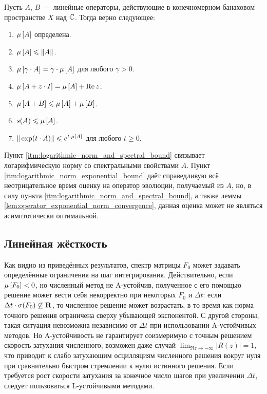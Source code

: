 \begin{statement}
    \label{stat:logarithmic_norm_properties}
    Пусть $ A $, $ B $~--- линейные операторы, действующие в конечномерном банаховом пространстве $ X $ над $ \mathbb{C} $.
    Тогда верно следующее:
    \begin{enumerate}[itemsep=0em]
        \item $ \mu \left[ A \right] $ определена.
        \item $ \mu \left[ A \right] \leqslant \| A \| $.
        \item $ \mu \left[ \gamma \cdot A \right] = \gamma \cdot \mu \left[ A \right] $ для любого $ \gamma > 0 $.
        \item $ \mu \left[ A + z \cdot I \right] = \mu \left[ A \right] + \operatorname{Re} z $.
        \item $ \mu \left[ A + B \right] \leqslant \mu \left[ A \right] + \mu \left[ B \right] $.
        \item $ s(A) \leqslant \mu \left[ A \right] $. \label{itm:logarithmic_norm_and_spectral_bound}
        \item $ \| \exp(t \cdot A) \| \leqslant e^{t \cdot \mu \left[ A \right]} $ для любого $ t \geqslant 0 $. \label{itm:logarithmic_norm_exponential_bound}
    \end{enumerate}
\end{statement}

Пункт \ref{itm:logarithmic_norm_and_spectral_bound} связывает логарифмическую норму со спектральными свойствами $ A $.
Пункт \ref{itm:logarithmic_norm_exponential_bound} даёт справедливую всё неотрицательное время оценку на оператор эволюции,
получаемый из $ A $, но, в силу пункта \ref{itm:logarithmic_norm_and_spectral_bound},
а также леммы \ref{lem:operator_exponential_norm_convergence},
данная оценка может не являться асимптотически оптимальной.


\subsection{Линейная жёсткость}
\label{subsec:linear_stiffness}

Как видно из приведённых результатов, спектр матрицы $ F_0 $ может задавать определённые ограничения на шаг интегрирования.
Действительно, если $ \mu \left[ F_0 \right] < 0 $, но численный метод не A-устойчив, полученное с его помощью решение может вести себя некорректно при некоторых $ F_0 $ и $ \Delta t $:
если $ \Delta t \cdot \sigma(F_0) \not\subseteq \mathbf{R} $, то численное решение может возрастать,
в то время как норма точного решения ограничена сверху убывающей экспонентой.
С другой стороны, такая ситуация невозможна независимо от $ \Delta t $ при использовании A-устойчивых методов.
Но A-устойчивость не гарантирует соизмеримую с точным решением скорость затухания численного; возможен даже случай $ \displaystyle \lim_{\Re z \to -\infty} |R(z)| = 1 $,
что приводит к слабо затухающим осцилляциям численного решения вокруг нуля при сравнительно быстром стремлении к нулю истинного решения.
Если требуется рост скорости затухания за конечное число шагов при увеличении $ \Delta t $, следует пользоваться L-устойчивыми методами.

